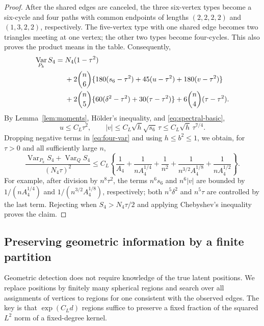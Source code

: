 \documentclass[11pt,reqno]{amsart}
\numberwithin{equation}{section}
\theoremstyle{definition}
\theoremstyle{remark}
\theoremstyle{definition}
\DeclareMathOperator{\Var}{Var}
\begin{document}
\begin{proof}
After the shared edges are canceled, the three six-vertex types become a six-cycle and four paths with common endpoints of lengths
$(2,2,2,2)$ and $(1,3,2,2)$, respectively.
The five-vertex type with one shared edge becomes two triangles meeting at one vertex;
the other two types become four-cycles. This also proves the product means in the table.
Consequently,
\begin{align}
 \Var_{P_k}S_4={}&N_4(1-\tau^2)\notag\\
 &+2\binom n6\{180(s_6-\tau^2)+45(u-\tau^2)+180(v-\tau^2)\}\notag\\
 &+2\binom n5\{60(\delta^2-\tau^2)+30(\tau-\tau^2)\}
       +6\binom n4(\tau-\tau^2).\label{eq:four-var}
\end{align}
By Lemma~\ref{lem:moments}, H\"older's inequality, and \eqref{eq:spectral-basic},
\[
 u\le C_L\tau^2,\qquad
 |v|\le C_L\sqrt h\sqrt{s_6}\,\tau\le C_L\sqrt h\,\tau^{7/4}.
\]
Dropping negative terms in \eqref{eq:four-var} and using $h\le b^2\le1$,
we obtain, for $\tau>0$ and all sufficiently large $n$,
\begin{equation}\label{eq:four-ratio}
 \frac{\Var_{P_k}S_4+\Var_QS_4}{(N_4\tau)^2}
 \le C_L\left\{
 \frac1{A_4}+\frac1{nA_4^{1/4}}+\frac1{n^2}
 +\frac1{n^{3/2}A_4^{1/8}}+\frac1{nA_4^{1/2}}
 \right\}.
\end{equation}
For example, after division by $n^8\tau^2$, the terms $n^6s_6$ and $n^6|v|$
are bounded by $1/(nA_4^{1/4})$ and $1/(n^{3/2}A_4^{1/8})$, respectively;
both $n^5\delta^2$ and $n^5\tau$ are controlled by the last term.
Rejecting when $S_4>N_4\tau/2$ and applying Chebyshev's inequality proves the claim.
\end{proof}

\subsection{Preserving geometric information by a finite partition}
Geometric detection does not require knowledge of the true latent positions. We replace positions by finitely many spherical regions
and search over all assignments of vertices to regions for one consistent with the observed edges.
The key is that $\exp(C_Ld)$ regions suffice to preserve a fixed fraction of the squared $L^2$ norm of a fixed-degree kernel.
\end{document}
